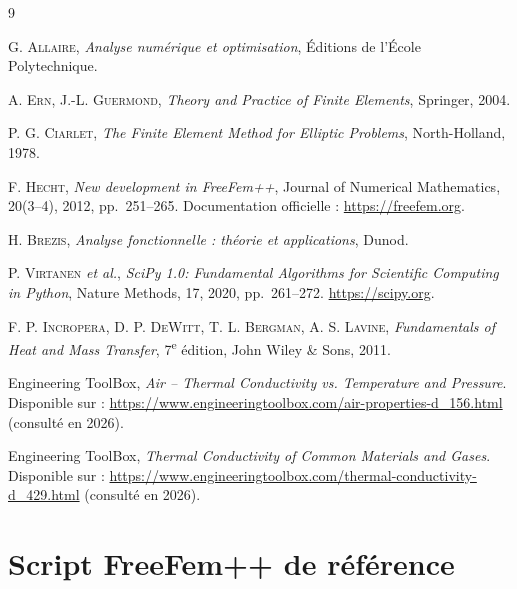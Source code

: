 \documentclass[12pt,a4paper]{article}
\begin{document}
	\begin{thebibliography}{9}
		
		G. \textsc{Allaire}, \emph{Analyse numérique et optimisation}, Éditions de l'École Polytechnique.
		
		A. \textsc{Ern}, J.-L. \textsc{Guermond}, \emph{Theory and Practice of Finite Elements}, Springer, 2004.
		
		P. G. \textsc{Ciarlet}, \emph{The Finite Element Method for Elliptic Problems}, North-Holland, 1978.
		
		F. \textsc{Hecht}, \emph{New development in FreeFem++}, Journal of Numerical Mathematics, 20(3--4), 2012, pp.~251--265. Documentation officielle : \url{https://freefem.org}.
		
		H. \textsc{Brezis}, \emph{Analyse fonctionnelle : théorie et applications}, Dunod.
		
		P. \textsc{Virtanen} \emph{et al.}, \emph{SciPy 1.0: Fundamental Algorithms for Scientific Computing in Python}, Nature Methods, 17, 2020, pp.~261--272. \url{https://scipy.org}.
		
		F. P. \textsc{Incropera}, D. P. \textsc{DeWitt}, T. L. \textsc{Bergman}, A. S. \textsc{Lavine}, \emph{Fundamentals of Heat and Mass Transfer}, 7\textsuperscript{e} édition, John Wiley \& Sons, 2011.
		
		Engineering ToolBox, \emph{Air -- Thermal Conductivity vs. Temperature and Pressure}. Disponible sur : \url{https://www.engineeringtoolbox.com/air-properties-d_156.html} (consulté en 2026).
		
		Engineering ToolBox, \emph{Thermal Conductivity of Common Materials and Gases}. Disponible sur : \url{https://www.engineeringtoolbox.com/thermal-conductivity-d_429.html} (consulté en 2026).
		
	\end{thebibliography}
	
	\appendix
	\section{Script FreeFem++ de référence}
	\label{annexe:freefem}
	
	
\end{document}
